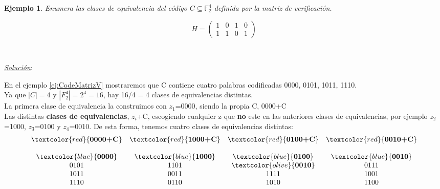 \documentclass{beamer}
\theoremstyle{plain}
\theoremstyle{example}
\theoremstyle{example}
\newtheorem{ejemplo} [Ejemplo] {Ejemplo}
\begin{document}
\begin{frame}  \small  

\begin{ejemplo}\label{ej:Coset}
Enumera las clases de equivalencia del código $C \subseteq \mathbb{F}_2^4$ definida por la matriz de verificación.

\[
   H=      \left( \begin{array}{cccc}
                  1 & 0 & 1 & 0\\
                  1 & 1 & 0 & 1 	  
           			\end{array}
    		\right) 	    		
\]
\end{ejemplo}

\

   

\end{frame} 
\begin{frame}  \footnotesize


\textit{\underline{Solución}}:\\
\vspace{0.2cm}

En el ejemplo \ref{ej:CodeMatrizV} mostraremos que C contiene cuatro palabras codificadas 0000, 0101, 1011, 1110.\\
\vspace*{4pt}
Ya que $|C| = 4$ y $|F_2^4| = 2^4 = 16$, hay 16/4 = 4 clases de equivalencias distintas.\\
\vspace*{4pt}
La primera clase de equivalencia la construimos con $z_1$=0000, siendo la propia C, 0000+C\\
\vspace*{4pt}
Las distintas \textbf{clases de equivalencias}, $z_i$+C, escogiendo cualquier z que \textbf{no} este en las anteriores clases de equivalencias, por ejemplo $z_2$=1000, $z_3$=0100 y $z_4$=0010. De esta forma, tenemos cuatro clases de equivalencias distintas:
\vspace*{4pt}
\tiny
\[
  \begin{array}{cccc}
          \textcolor{red}{\textbf{0000+C}} & \textcolor{red}{\textbf{1000+C}}  & \textcolor{red}{\textbf{0100+C}} & \textcolor{red}{\textbf{0010+C}} \\
                   &  &  & \\	
                    \textcolor{blue}{\textbf{0000}} & \textcolor{blue}{\textbf{1000}} & \textcolor{blue}{\textbf{0100}}	 & \textcolor{blue}{\textbf{0010}}\\ 
				    0101 & 1101 & \textcolor{olive}{\textbf{0010}}  & 0111\\
					1011 & 0011 & 1111 & 1001\\
				    1110 & 0110 & 1010 &	1100\\
           			\end{array}
\]
   

\end{frame} 
\end{document}
